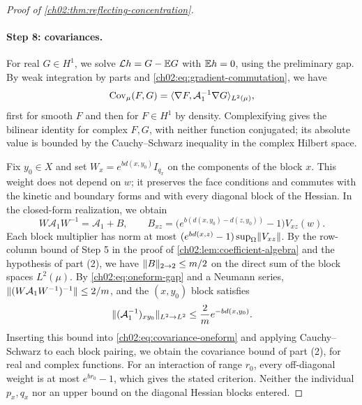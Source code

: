 \begin{proof}[Proof of \cref{ch02:thm:reflecting-concentration}]
\paragraph{Step 8: covariances.} For real $G\in H^1$, we solve $\mathcal Lh=G-\mathbb E G$ with $\mathbb E h=0$, using the preliminary gap. By weak integration by parts and \eqref{ch02:eq:gradient-commutation}, we have
\begin{equation}\label{ch02:eq:covariance-oneform}
 \operatorname{Cov}_\mu(F,G)=\langle \nabla F,\mathcal A_1^{-1}\nabla G\rangle_{L^2(\mu)},
\end{equation}
first for smooth $F$ and then for $F\in H^1$ by density. Complexifying gives the bilinear identity for complex $F,G$, with neither function conjugated; its absolute value is bounded by the Cauchy--Schwarz inequality in the complex Hilbert space.

Fix $y_0\in X$ and set $W_x=e^{bd(x,y_0)}I_{q_x}$ on the components of the block $x$. This weight does not depend on $w$; it preserves the face conditions and commutes with the kinetic and boundary forms and with every diagonal block of the Hessian. In the closed-form realization, we obtain
\[
 W\mathcal A_1W^{-1}=\mathcal A_1+B,\qquad B_{xz}=\bigl(e^{b(d(x,y_0)-d(z,y_0))}-1\bigr)V_{xz}(w).
\]
Each block multiplier has norm at most $(e^{bd(x,z)}-1)\sup_\Omega\lVert V_{xz}\rVert$. By the row-column bound of Step 5 in the proof of \cref{ch02:lem:coefficient-algebra} and the hypothesis of part (2), we have $\lVert B\rVert_{2\to2}\le m/2$ on the direct sum of the block spaces $L^2(\mu)$. By \eqref{ch02:eq:oneform-gap} and a Neumann series, $\lVert (W\mathcal A_1W^{-1})^{-1}\rVert\le2/m$, and the $(x,y_0)$ block satisfies
\[
 \lVert (\mathcal A_1^{-1})_{xy_0}\rVert_{L^2\to L^2}\le\frac2me^{-bd(x,y_0)}.
\]
Inserting this bound into \eqref{ch02:eq:covariance-oneform} and applying Cauchy--Schwarz to each block pairing, we obtain the covariance bound of part (2), for real and complex functions. For an interaction of range $r_0$, every off-diagonal weight is at most $e^{br_0}-1$, which gives the stated criterion. Neither the individual $p_x,q_x$ nor an upper bound on the diagonal Hessian blocks entered.


\end{proof}
